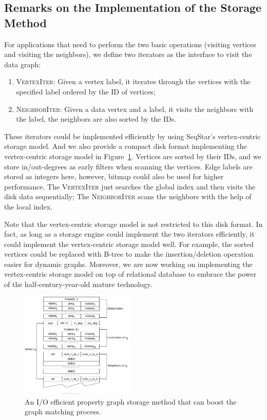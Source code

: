 \subsection{Remarks on the Implementation of the Storage Method}\label{sec:storage_iterators}
For applications that need to perform the two basic operations (visiting vertices and visiting the neighbors),
we define two iterators as the interface to visit the data graph:
\begin{enumerate}[noitemsep]
\item \textsc{VertexIter}: Given a vertex label, it iterates through the vertices with the specified label ordered by the ID of vertices;
\item \textsc{NeighborIter}: Given a data vertex and a label, it visits the neighbors with the label, the neighbors are also sorted by the IDs.
\end{enumerate}

These iterators could be implemented efficiently by using SeqStar's vertex-centric storage model.
And we also provide a compact disk format implementing the vertex-centric storage model in Figure~\ref{img:data_graph}.
Vertices are sorted by their IDs, and we store in/out-degrees as early filters when scanning the vertices.
Edge labels are stored as integers here, however, bitmap could also be used for higher performance.
The \textsc{VertexIter} just searches the global index and then visits the disk data sequentially;
The \textsc{NeighborIter} scans the neighbors with the help of the local index.

Note that the vertex-centric storage model is not restricted to this disk format.
In fact, as long as a storage engine could implement the two iterators efficiently,
it could implement the vertex-centric storage model well.
For example, the sorted vertices could be replaced with B-tree to make the insertion/deletion operation easier for dynamic graphs.
Moreover, we are now working on implementing the vertex-centric storage model on top of relational database to embrace the power of the half-century-year-old mature technology.
\begin{figure}[ht]
  \centering
  \includegraphics[width=0.48\textwidth]{img/data_graph.pdf}
  \caption{An I/O efficient property graph storage method that can boost the graph matching process.}\label{img:data_graph}
\end{figure}
